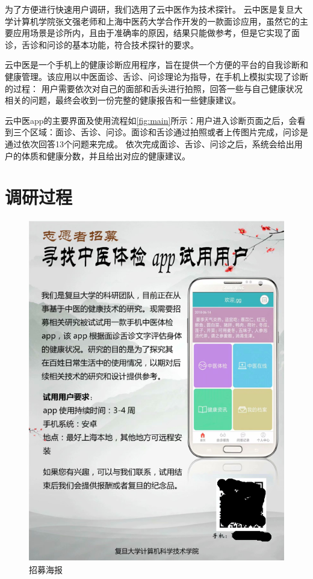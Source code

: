 为了方便进行快速用户调研，我们选用了云中医\cite{Zhang2018Study}作为技术探针。
云中医是复旦大学计算机学院张文强老师和上海中医药大学合作开发的一款面诊应用，虽然它的主要应用场景是诊所内，且由于准确率的原因，结果只能做参考，但是它实现了面诊，舌诊和问诊的基本功能，符合技术探针的要求。

云中医是一个手机上的健康诊断应用程序，旨在提供一个方便的平台的自我诊断和健康管理。该应用以中医面诊、舌诊、问诊理论为指导，在手机上模拟实现了诊断的过程：
用户需要依次对自己的面部和舌头进行拍照，回答一些与自己健康状况相关的问题，最终会收到一份完整的健康报告和一些健康建议。

云中医app的主要界面及使用流程如\ref{fig:main}所示：用户进入诊断页面之后，会看到三个区域：面诊、舌诊、问诊。面诊和舌诊通过拍照或者上传图片完成，问诊是通过依次回答13个问题来完成。
依次完成面诊、舌诊、问诊之后，系统会给出用户的体质和健康分数，并且给出对应的健康建议。



\section{调研过程}
 
\begin{figure}[h]
    \centering
    \includegraphics[height=15cm]{images/poster.png}
    \caption{招募海报}
    \label{fig:poster}
\end{figure}


